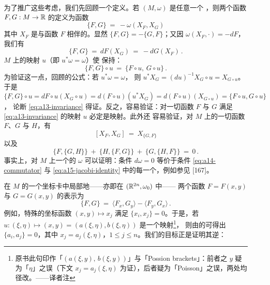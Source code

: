 为了推广这些考虑，我们先回顾一个定义。若 $(M,\omega)$ 是任意一个%
\trSymplecticManifold，则两个函数 $F,G:M\to\mathbb{R}$ 的\trPoissonBracket{}定义为函数
\begin{equation}\label{eq:a11-poisson-def}
\{F,G\}\ =\ -\omega(X_{F},X_{G})
\end{equation}
其中 $X_{F}$ 是与函数 $F$ 相伴的\trHamiltonianVectorField。显然%
 $\{F,G\}=-\{G,F\}$；又因 $\omega(X_{F},\cdot)=-dF$，我们有
\begin{equation}\label{eq:a12-poisson-d}
\{F,G\}\ =\ dF(X_{G})\ =\ -dG(X_{F})\,.
\end{equation}
$M$ 上的\trSymplectic{}映射 $u$（即 $u^{*}\omega=\omega$）使\trPoissonBracket{}%
保持\trInvariant：
\begin{equation}\label{eq:a13-invariance}
\{F,G\}\circ u\ =\ \{F\circ u,\ G\circ u\}\,.
\end{equation}
为验证这一点，回顾\trHamiltonianVectorField{}的\trTransformation{}公式：若 $u^{*}\omega=\omega$，%
则 $u^{*}X_{G}=(du)^{-1}X_{G}\circ u=X_{G\circ u}$。于是%
 $\{F,G\}\circ u=dF\circ u(X_{G}\circ u)=d(F\circ u)(u^{*}X_{G})=d(F\circ u)(X_{G\circ u})=\{F\circ u,G\circ u\}$，%
论断 \eqref{eq:a13-invariance} 得证。反之，容易验证：对一切函数 $F$ 与 $G$ %
满足 \eqref{eq:a13-invariance} 的映射 $u$ 必定是\trSymplectic{}映射。此外还%
容易验证，对 $M$ 上的一切函数 $F$、$G$ 与 $H$，有
\begin{equation}\label{eq:a14-commutator}
[X_{F},X_{G}]\ =\ X_{\{G,F\}}
\end{equation}
以及
\begin{equation}\label{eq:a15-jacobi-identity}
\{F,\{G,H\}\}\ +\ \{H,\{F,G\}\}\ +\ \{G,\{H,F\}\}\ =\ 0\,.
\end{equation}
事实上，对 $M$ 上一个\trNondegenerate{}的\trTwoForm{} $\omega$ 可以证明：条件%
 $d\omega=0$ 等价于条件 \eqref{eq:a14-commutator} 与%
 \eqref{eq:a15-jacobi-identity} 中的每一个，例如参见 [167]。

在 $M$ 的一个\trDarboux{}坐标卡中局部地——亦即在 $(\mathbb{R}^{2n},\omega_{0})$ 中——%
两个函数 $F=F(x,y)$ 与 $G=G(x,y)$ 的\trPoissonBracket{}表示为
\begin{equation}\label{eq:a16-darboux-poisson}
\{F,G\}\ =\ \langle F_{x},G_{y}\rangle-\langle F_{y},G_{x}\rangle\,.
\end{equation}
例如，特殊的坐标函数 $(x,y)\mapsto x_{j}$ 满足 $\{x_{i},x_{j}\}=0$。于是，若%
 $u:(\xi,\eta)\mapsto(x,y)=(a(\xi,\eta),b(\xi,\eta))$ 是一个\trSymplectic{}映射\footnote{原书此句印作「$(a(\xi,y),\,b(\xi,y))$」与「Possion brackets」：前者之 $y$ 疑为「$\eta$」之误（下文 $x_{j}=a_{j}(\xi,\eta)$ 为证），后者疑为「Poisson」之误，两处均径改。——译者注}，%
则由\trPoissonBracket{}的\trInvariance{}可得出 $\{a_{i},a_{j}\}=0$，其中%
 $x_{j}=a_{j}(\xi,\eta)$，$1\leq j\leq n$。我们的目标正是证明其逆：

